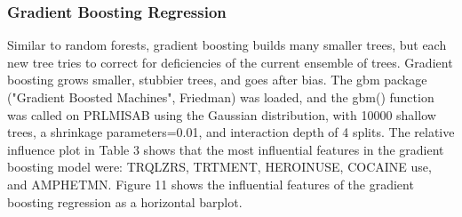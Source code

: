 \documentclass[sigconf]{acmart}
\begin{document}

\subsubsection{Gradient Boosting Regression}

Similar to random forests, gradient boosting builds many smaller trees, but 
each new tree tries to correct for deficiencies of the current ensemble of 
trees. Gradient boosting grows smaller, stubbier trees, and goes after bias. 
The gbm package ("Gradient Boosted Machines", Friedman) was loaded, and the 
gbm() function was called on PRLMISAB using the Gaussian distribution, with
10000 shallow trees, a shrinkage parameters=0.01, and interaction depth of 
4 splits. The relative influence plot in Table 3 shows that the most 
influential features in the gradient boosting model were: TRQLZRS, TRTMENT,
HEROINUSE, COCAINE use, and AMPHETMN. Figure 11 shows the influential 
features of the gradient boosting regression as a horizontal barplot. 

\end{document}
